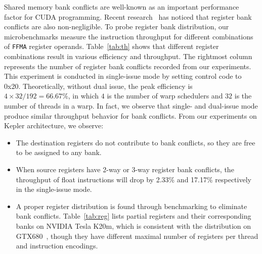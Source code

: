 Shared memory bank conflicts are well-known as an important performance factor for CUDA programming.
Recent research~\cite{lai} has noticed that register bank conflicts are also non-negligible.
To probe register bank distribution, our microbenchmarks measure the instruction throughput for different combinations of {\tt FFMA} register operands.
Table~\ref{tab:th} shows that different register combinations result in various efficiency and throughput.
The rightmost column represents the number of register bank conflicts recorded from our experiments.
This experiment is conducted in single-issue mode by setting control code to 0x20.
Theoretically, without dual issue, the peak efficiency is $4\times32/192=66.67\%$, in which $4$ is the number of warp schedulers and $32$
is the number of threads in a warp.
In fact, we observe that single- and dual-issue mode produce similar throughput behavior for bank conflicts.
From our experiments on Kepler architecture, we observe:
\begin{itemize}
\item The destination registers do not contribute to bank conflicts, so they are free to be assigned to any bank.%
\item When source registers have 2-way or 3-way register bank conflicts, the throughput of float instructions will drop by 2.33\% and 17.17\% respectively in the single-issue mode.
\item A proper register distribution is found through benchmarking to eliminate bank conflicts.
     Table~\ref{tab:reg} lists partial registers and their corresponding banks on NVIDIA Tesla K20m, which is consistent with the distribution on GTX680~\cite{lai}, though they have different maximal number of registers per thread and instruction encodings.

\end{itemize}



